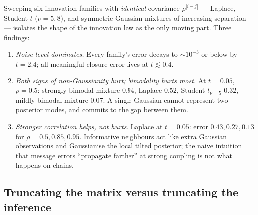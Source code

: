 Sweeping six innovation families with \emph{identical} covariance
$\rho^{|i-j|}$ --- Laplace, Student-$t$ ($\nu = 5, 8$), and symmetric
Gaussian mixtures of increasing separation --- isolates the shape of the
innovation law as the only moving part. Three findings:
\begin{enumerate}
  \item \emph{Noise level dominates.} Every family's error decays to
  $\sim 10^{-3}$ or below by $t = 2.4$; all meaningful closure error lives
  at $t \lesssim 0.4$.
  \item \emph{Both signs of non-Gaussianity hurt; bimodality hurts most.}
  At $t = 0.05$, $\rho = 0.5$: strongly bimodal mixture $0.94$, Laplace
  $0.52$, Student-$t_{\nu=5}$ $0.32$, mildly bimodal mixture $0.07$. A
  single Gaussian cannot represent two posterior modes, and commits to the
  gap between them.
  \item \emph{Stronger correlation helps, not hurts.} Laplace at
  $t = 0.05$: error $0.43, 0.27, 0.13$ for $\rho = 0.5, 0.85, 0.95$.
  Informative neighbours act like extra Gaussian observations and
  Gaussianise the local tilted posterior; the naive intuition that message
  errors ``propagate farther'' at strong coupling is not what happens on
  chains.
\end{enumerate}

\subsection{Truncating the matrix versus truncating the inference}
\label{sec:bp-truncation}

